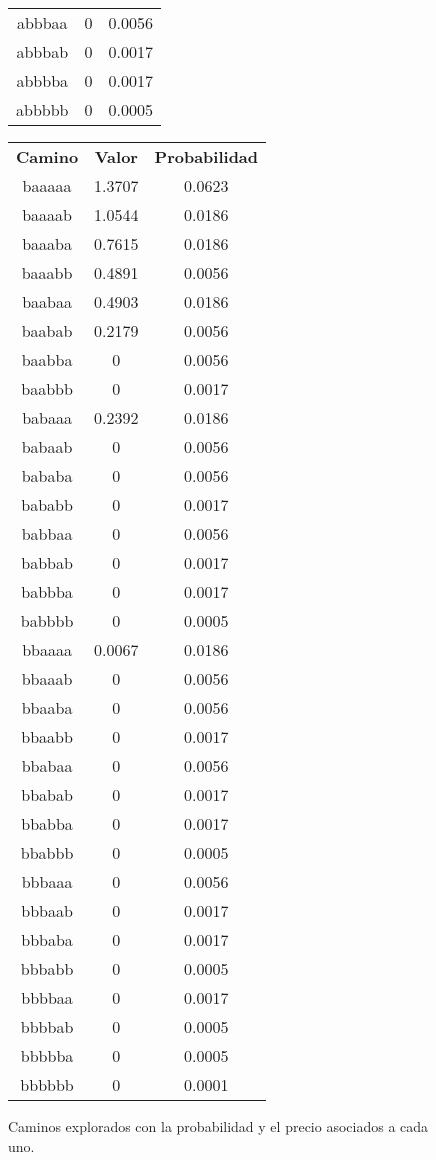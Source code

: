 \begin{figure}[hbpt]
\begin{minipage}{0.48\textwidth}
\begin{center}
\begin{tabular}{|c|c|c|}
abbbaa  & 0 &  0.0056  \\
abbbab  & 0 &  0.0017  \\
abbbba  & 0 &  0.0017  \\
abbbbb  & 0 &  0.0005  \\
\hline
\end{tabular}
\end{center}
\end{minipage}
\begin{minipage}{0.48\textwidth}
\begin{center}
\begin{tabular}{|c|c|c|}
\hline
\textbf{Camino} & \textbf{Valor} & \textbf{Probabilidad} \\
baaaaa  &  1.3707  &  0.0623  \\
baaaab  &  1.0544  &  0.0186  \\
baaaba  &  0.7615  &  0.0186  \\
baaabb  &  0.4891  &  0.0056  \\
baabaa  &  0.4903  &  0.0186  \\
baabab  &  0.2179  &  0.0056  \\
baabba  & 0 &  0.0056  \\
baabbb  & 0 &  0.0017  \\
babaaa  &  0.2392  &  0.0186  \\
babaab  & 0 &  0.0056  \\
bababa  & 0 &  0.0056  \\
bababb  & 0 &  0.0017  \\
babbaa  & 0 &  0.0056  \\
babbab  & 0 &  0.0017  \\
babbba  & 0 &  0.0017  \\
babbbb  & 0 &  0.0005  \\
bbaaaa  &  0.0067  &  0.0186  \\
bbaaab  & 0 &  0.0056  \\
bbaaba  & 0 &  0.0056  \\
bbaabb  & 0 &  0.0017  \\
bbabaa  & 0 &  0.0056  \\
bbabab  & 0 &  0.0017  \\
bbabba  & 0 &  0.0017  \\
bbabbb  & 0 &  0.0005  \\
bbbaaa  & 0 &  0.0056  \\
bbbaab  & 0 &  0.0017  \\
bbbaba  & 0 &  0.0017  \\
bbbabb  & 0 &  0.0005  \\
bbbbaa  & 0 &  0.0017  \\
bbbbab  & 0 &  0.0005  \\
bbbbba  & 0 &  0.0005  \\
bbbbbb  & 0 &  0.0001  \\
\hline
\end{tabular}
\end{center}
\end{minipage}
\caption{Caminos explorados con la probabilidad y el precio asociados a cada uno.}
\label{fig:2_3a}
\end{figure}

